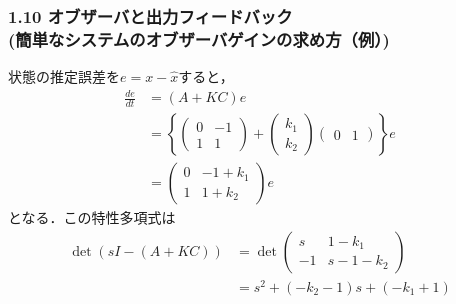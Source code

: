 \documentclass[10pt]{beamer}
\begin{document}
\begin{frame}[t]
\frametitle{1.10 オブザーバと出力フィードバック \\
(簡単なシステムのオブザーバゲインの求め方（例）)}
状態の推定誤差を$e = x - \hat{x}$すると，
\begin{align}
 \frac{de}{dt}
 &= (A+KC) e
 \nonumber \\
 &=
 \left\{
 \left(
 \begin{array}{cc}
  0 & -1 \\
  1 & 1
 \end{array}
 \right)
 + 
 \left( 
 \begin{array}{c}
  k_1 \\
  k_2
 \end{array}
 \right)
 \left(
 \begin{array}{cc}
  0 & 1
 \end{array}
 \right)
 \right\} e
\nonumber \\
 &=
 \left(
 \begin{array}{cc}
  0 & -1 +k_1\\
  1 & 1 + k_2
 \end{array}
 \right)  e
\end{align}
となる．この特性多項式は
\begin{align}
 \operatorname{det} (sI-(A+KC))
 &=\operatorname{det} 
  \left(
  \begin{array}{cc}
   s & 1 -k_1\\
   -1 & s-1 - k_2
  \end{array}
  \right)
 \nonumber \\
 &= s^2 + (-k_2 - 1)s + (-k_1 + 1)
\end{align}
\end{frame}
\end{document}
